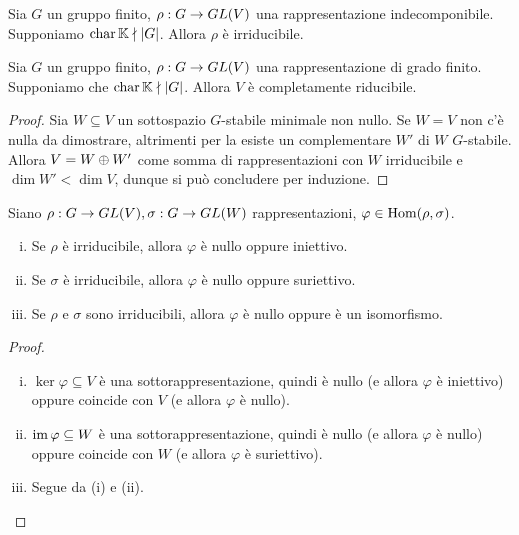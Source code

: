 \begin{corollary}
Sia $G$ un gruppo finito, $\rho:G\to GL(V)$ una rappresentazione indecomponibile. Supponiamo $\operatorname{char}\mathbb{K}\nmid |G|$. Allora $\rho$ è irriducibile.
\end{corollary}

\begin{proposition}
Sia $G$ un gruppo finito, $\rho:G\to GL(V)$ una rappresentazione di grado finito. Supponiamo che $\operatorname{char}\mathbb{K}\nmid|G|$. Allora $V$ è completamente riducibile.
\end{proposition}
\begin{proof}
Sia $W\subseteq V$ un sottospazio $G$-stabile minimale non nullo. Se $W=V$ non c'è nulla da dimostrare, altrimenti per la  esiste un complementare $W'$ di $W$ $G$-stabile. Allora $V=W\oplus W'$ come somma di rappresentazioni con $W$ irriducibile e $\dim W'<\dim V$, dunque si può concludere per induzione.
\end{proof}

\begin{proposition}
Siano $\rho:G\to GL(V),\allowbreak\sigma:G\to GL(W)$ rappresentazioni, $\varphi\in\operatorname{Hom}(\rho,\sigma)$.
\begin{enumerate}[(i)]
\item Se $\rho$ è irriducibile, allora $\varphi$ è nullo oppure iniettivo.
\item Se $\sigma$ è irriducibile, allora $\varphi$ è nullo oppure suriettivo.
\item Se $\rho$ e $\sigma$ sono irriducibili, allora $\varphi$ è nullo oppure è un isomorfismo.
\end{enumerate}
\end{proposition}
\begin{proof}\leavevmode
\begin{enumerate}[(i)]
\item $\ker\varphi\subseteq V$ è una sottorappresentazione, quindi è nullo (e allora $\varphi$ è iniettivo) oppure coincide con $V$ (e allora $\varphi$ è nullo).
\item $\operatorname{im}\varphi\subseteq W$ è una sottorappresentazione, quindi è nullo (e allora $\varphi$ è nullo) oppure coincide con $W$ (e allora $\varphi$ è suriettivo).
\item Segue da (i) e (ii).
\end{enumerate}
\end{proof}

